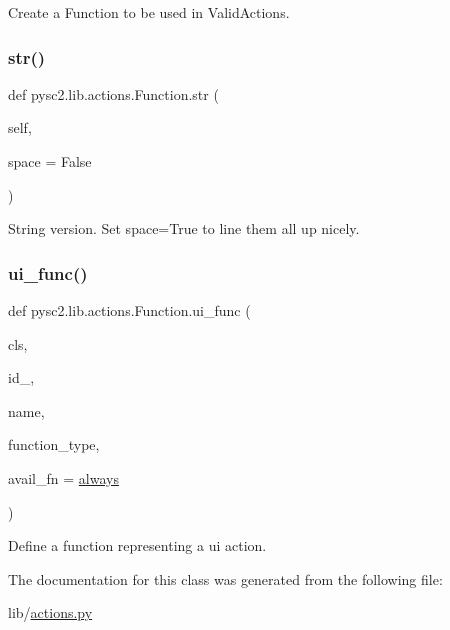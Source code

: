 \begin{DoxyVerb}Create a Function to be used in ValidActions.\end{DoxyVerb}
 \mbox{\label{classpysc2_1_1lib_1_1actions_1_1_function_a98ad5ff5cc2cbd2656c25dbf0d60c8a4}} 
\subsubsection{\texorpdfstring{str()}{str()}}
{\footnotesize\ttfamily def pysc2.\+lib.\+actions.\+Function.\+str (\begin{DoxyParamCaption}\item[{}]{self,  }\item[{}]{space = {\ttfamily False} }\end{DoxyParamCaption})}

\begin{DoxyVerb}String version. Set space=True to line them all up nicely.\end{DoxyVerb}
 \mbox{\label{classpysc2_1_1lib_1_1actions_1_1_function_a2c4bb777e80bd4cdeaa012e85f85b4be}} 
\subsubsection{\texorpdfstring{ui\+\_\+func()}{ui\_func()}}
{\footnotesize\ttfamily def pysc2.\+lib.\+actions.\+Function.\+ui\+\_\+func (\begin{DoxyParamCaption}\item[{}]{cls,  }\item[{}]{id\+\_\+,  }\item[{}]{name,  }\item[{}]{function\+\_\+type,  }\item[{}]{avail\+\_\+fn = {\ttfamily \mbox{\hyperlink{namespacepysc2_1_1lib_1_1actions_ae1dc5f547908d78c7367d3c734b29a59}{always}}} }\end{DoxyParamCaption})}

\begin{DoxyVerb}Define a function representing a ui action.\end{DoxyVerb}
 

The documentation for this class was generated from the following file\+:\begin{DoxyCompactItemize}
\item 
lib/\mbox{\hyperlink{actions_8py}{actions.\+py}}\end{DoxyCompactItemize}
